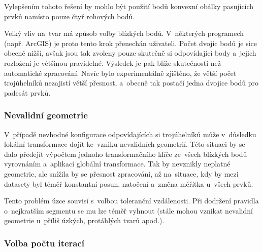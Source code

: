 Vylepšením tohoto řešení by mohlo být použití bodů konvexní obálky pasujících
prvků namísto pouze čtyř rohových bodů.

Velký vliv na~tvar  má způsob volby blízkých bodů. V~některých programech
(např. ArcGIS) je proto tento krok přenechán uživateli. Počet dvojic bodů je
sice obecně nižší, avšak jsou tak zvoleny pouze skutečně si odpovídající body
a~jejich rozložení je většinou pravidelné. Výsledek je pak blíže skutečnosti
než automatické zpracování. Navíc bylo experimentálně zjištěno, že větší počet
trojúhelníků nezajistí větší přesnost, a~obecně tak postačí jedna dvojice
bodů pro padesát prvků. %

\subsubsection{Nevalidní geometrie}

V~případě nevhodné konfigurace odpovídajících si trojúhelníků může v~důsledku
lokální transformace dojít ke~vzniku nevalidních geometrií. Této situaci by se
dalo předejít výpočtem jednoho transformačního klíče ze~všech blízkých bodů
vyrovnáním a~aplikací globální transformace. Tak by nevznikly neplatné geometrie,
ale snížila by se přesnost zpracování, až na~situace, kdy by mezi datasety byl
téměř konstantní posun, natočení a~změna měřítka u~všech prvků.


Tento problém úzce souvisí s~volbou toleranční vzdálenosti. Při dodržení pravidla
o~nejkratším segmentu  se mu lze téměř vyhnout (stále mohou vznikat nevalidní 
geometrie u~příliš úzkých, protáhlých tvarů apod.). 


\subsubsection{Volba počtu iterací}

